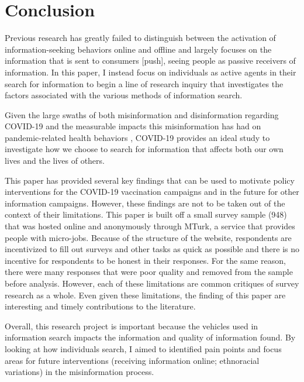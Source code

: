 \hypertarget{conclusion}{%
\section{Conclusion}\label{conclusion}}

Previous research has greatly failed to distinguish between the activation of
information-seeking behaviors online and offline and largely focuses on the
information that is sent to consumers [push], seeing people as passive receivers
of information. In this paper, I instead focus on individuals as active agents
in their search for information to begin a line of research inquiry that
investigates the factors associated with the various methods of information
search.

Given the large swaths of both misinformation and disinformation regarding
COVID-19 \citep{pathakInfodemicsCOVID19Role2020, mottaHowRightLeaningMedia2020, shahsavariConspiracyTimeCorona2020} 
and the measurable impacts this misinformation has had on pandemic-related health behaviors
\citep{loombaMeasuringImpactCOVID192021, greene_murphy21}, COVID-19 provides an ideal study to
investigate how we choose to search for information that affects both our own
lives and the lives of others.

This paper has provided several key findings that can be used to motivate policy
interventions for the COVID-19 vaccination campaigns and in the future for other
information campaigns. However, these findings are not to be taken out of the
context of their limitations. This paper is built off a small survey sample (948)
that was hosted online and anonymously through MTurk, a service
that provides people with micro-jobs. Because of the structure of the website,
respondents are incentivized to fill out surveys and other tasks 
as quick as possible and there is no incentive for respondents to be honest
in their responses. For the same reason, there were many responses that 
were poor quality and removed from the sample before analysis.
However, each of these limitations are common critiques of 
survey research as a whole. Even given these limitations,
the finding of this paper are interesting and timely contributions to the literature.

Overall, this research project is important because the vehicles used in
information search impacts the information and quality of information found. By
looking at how individuals search, I aimed to identified pain points and focus areas
for future interventions (receiving information online; ethnoracial variations) 
in the misinformation process.